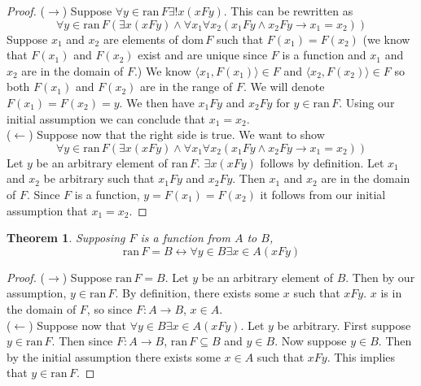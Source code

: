 \documentclass{report}
\newtheorem{theorem}[theo]{Theorem}
\begin{document}
\begin{proof} ($\rightarrow$)
Suppose $\forall y\in\text{ran}\,F\exists!x(xFy)$. This can be rewritten as
\begin{equation*}
\forall y\in\text{ran}\,F(\exists x(xFy)\land\forall x_1\forall x_2(x_1Fy\land x_2Fy\to x_1=x_2))
\end{equation*}
Suppose $x_1$ and $x_2$ are elements of dom$\,F$ such that $F(x_1)=F(x_2)$ (we know that $F(x_1)$ and $F(x_2)$ exist and are unique since $F$ is a function and $x_1$ and $x_2$ are in
the domain of $F$.) We know $\langle x_1,F(x_1)\rangle\in F$ and $\langle x_2,F(x_2)\rangle\in F$ so both $F(x_1)$ and $F(x_2)$ are in the range of $F$. We will denote $F(x_1)=F(x_2)=y$. 
We then have $x_1Fy$ and $x_2Fy$ for $y\in\text{ran}\,F$. Using our initial assumption we can conclude that $x_1=x_2$.\\
\indent($\leftarrow$) Suppose now that the right side is true. We want to show
\begin{equation*}
\forall y\in\text{ran}\,F(\exists x(xFy)\land\forall x_1\forall x_2(x_1Fy\land x_2Fy\to x_1=x_2))
\end{equation*}
Let $y$ be an arbitrary element of ran$\,F$. $\exists x(xFy)$ follows by definition. Let $x_1$ and $x_2$ be arbitrary such that $x_1Fy$ and $x_2Fy$. Then $x_1$ and $x_2$ are in the domain of $F$.
Since $F$ is a function, $y=F(x_1)=F(x_2)$ it follows from our initial assumption that $x_1=x_2$.
\end{proof}
\begin{theorem}
Supposing $F$ is a function from $A$ to $B$,
\begin{equation*}
\text{ran}\,F=B\leftrightarrow\forall y\in B\exists x\in A(xFy)
\end{equation*}
\end{theorem}
\begin{proof}
\indent ($\rightarrow$) Suppose $\text{ran}\,F=B$. Let $y$ be an arbitrary element of $B$.
Then by our assumption, $y\in\text{ran}\,F$. By definition, there exists some $x$ such that $xFy$.
$x$ is in the domain of $F$, so since $F:A\to B$, $x\in A$.\\
\indent ($\leftarrow$) Suppose now that $\forall y\in B\exists x\in A(xFy)$. Let $y$ be arbitrary. First suppose $y\in\text{ran}\,F$. Then since $F:A\to B$, $\text{ran}\,F\subseteq B$ and $y\in B$.
Now suppose $y\in B$. Then by the initial assumption there exists some $x\in A$ such that $xFy$.
This implies that $y\in\text{ran}\,F$.
\end{proof}
\newpage
\end{document}
